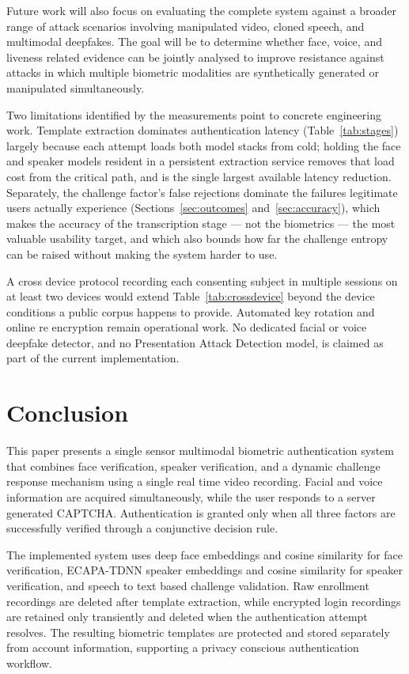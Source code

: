 \documentclass[runningheads]{llncs}
\begin{document}
Future work will also focus on evaluating the complete system against a broader range of attack scenarios involving manipulated video, cloned speech, and multimodal deepfakes. The goal will be to determine whether face, voice, and liveness related evidence can be jointly analysed to improve resistance against attacks in which multiple biometric modalities are synthetically generated or manipulated simultaneously.

Two limitations identified by the measurements point to concrete engineering work. Template extraction dominates authentication latency (Table~\ref{tab:stages}) largely because each attempt loads both model stacks from cold; holding the face and speaker models resident in a persistent extraction service removes that load cost from the critical path, and is the single largest available latency reduction. Separately, the challenge factor's false rejections dominate the failures legitimate users actually experience (Sections~\ref{sec:outcomes} and~\ref{sec:accuracy}), which makes the accuracy of the transcription stage --- not the biometrics --- the most valuable usability target, and which also bounds how far the challenge entropy can be raised without making the system harder to use.

A cross device protocol recording each consenting subject in multiple sessions on at least two devices would extend Table~\ref{tab:crossdevice} beyond the device conditions a public corpus happens to provide. Automated key rotation and online re encryption remain operational work. No dedicated facial or voice deepfake detector, and no Presentation Attack Detection model, is claimed as part of the current implementation.

\section{Conclusion}\label{sec:conclusion}
This paper presents a single sensor multimodal biometric authentication system that combines face verification, speaker verification, and a dynamic challenge response mechanism using a single real time video recording. Facial and voice information are acquired simultaneously, while the user responds to a server generated CAPTCHA. Authentication is granted only when all three factors are successfully verified through a conjunctive decision rule.

The implemented system uses deep face embeddings and cosine similarity for face verification, ECAPA-TDNN speaker embeddings and cosine similarity for speaker verification, and speech to text based challenge validation. Raw enrollment recordings are deleted after template extraction, while encrypted login recordings are retained only transiently and deleted when the authentication attempt resolves. The resulting biometric templates are protected and stored separately from account information, supporting a privacy conscious authentication workflow.
\end{document}
